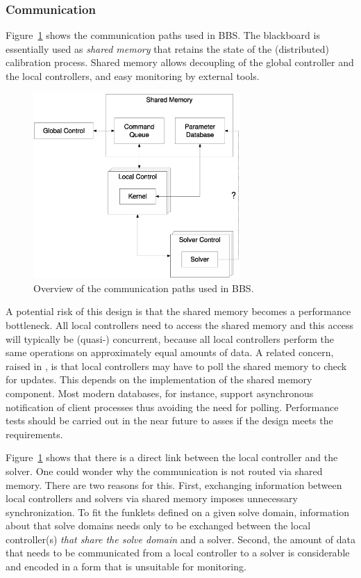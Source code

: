 \documentclass[10pt]{lofar}
\begin{document}
\subsubsection{Communication}
\label{subsubsec:distribution-communication}

Figure~\ref{fig:distribution-communication} shows the communication paths used
in BBS. The blackboard is essentially used as \emph{shared memory} that retains
the state of the (distributed) calibration process. Shared memory allows
decoupling of the global controller and the local controllers, and easy
monitoring by external tools.

\begin{figure}[htb!]
\centering
\includegraphics[width=0.7\textwidth]{images/communication.eps}
\caption{Overview of the communication paths used in BBS.}
\label{fig:distribution-communication}
\end{figure}

A potential risk of this design is that the shared memory becomes a performance
bottleneck.  All local controllers need to access the shared memory and this
access will typically be (quasi-) concurrent, because all local controllers
perform the same operations on approximately equal amounts of data. A related
concern, raised in \cite[p.19]{LOFAR-ASTRON-SDD-052}, is that local controllers
may have to poll the shared memory to check for updates. This depends on the
implementation of the shared memory component. Most modern databases, for
instance, support asynchronous notification of client processes thus avoiding
the need for polling. Performance tests should be carried out in the near future
to asses if the design meets the requirements.

Figure~\ref{fig:distribution-communication} shows that there is a direct link
between the local controller and the solver. One could wonder why the
communication is not routed via shared memory. There are two reasons for this.
First, exchanging information between local controllers and solvers via shared
memory imposes unnecessary synchronization. To fit the funklets defined on a
given solve domain, information about that solve domains needs only to be
exchanged between the local controller(s) \emph{that share the solve domain} and
a solver. Second, the amount of data that needs to be communicated from a local
controller to a solver is considerable and encoded in a form that is unsuitable
for monitoring.
\end{document}
